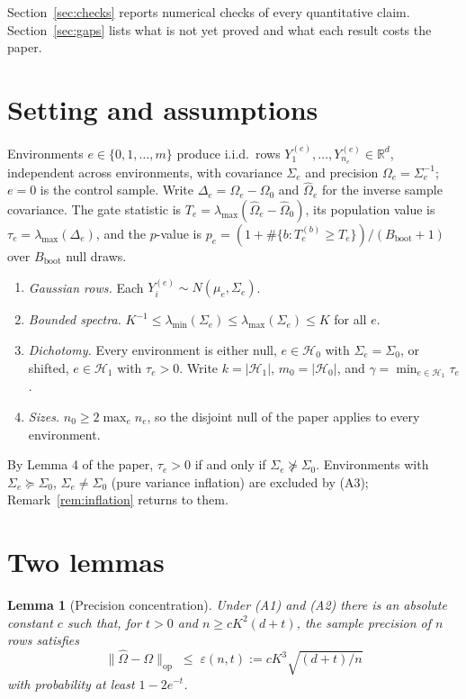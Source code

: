 \documentclass[11pt]{article}
\newtheorem{lemma}{Lemma}
\theoremstyle{remark}
\newcommand{\R}{\mathbb{R}}
\newcommand{\op}{\operatorname}
\newcommand{\Hone}{\mathcal{H}_1}
\newcommand{\Hzero}{\mathcal{H}_0}
\newcommand{\Bb}{B_{\mathrm{boot}}}
\begin{document}
Section~\ref{sec:checks} reports numerical checks of every quantitative claim. Section~\ref{sec:gaps} lists what is not yet proved and what each result costs the paper.

\section{Setting and assumptions}

Environments $e\in\{0,1,\ldots,m\}$ produce i.i.d.\ rows $Y^{(e)}_1,\ldots,Y^{(e)}_{n_e}\in\R^d$, independent across environments, with covariance $\Sigma_e$ and precision $\Omega_e=\Sigma_e^{-1}$; $e=0$ is the control sample. Write $\Delta_e=\Omega_e-\Omega_0$ and $\widehat\Omega_e$ for the inverse sample covariance. The gate statistic is $T_e=\lambda_{\max}(\widehat\Omega_e-\widehat\Omega_0)$, its population value is $\tau_e=\lambda_{\max}(\Delta_e)$, and the $p$-value is $p_e=(1+\#\{b:T_e^{(b)}\ge T_e\})/(\Bb+1)$ over $\Bb$ null draws.

\begin{enumerate}
  \item[(A1)] \emph{Gaussian rows.} Each $Y^{(e)}_i\sim N(\mu_e,\Sigma_e)$.
  \item[(A2)] \emph{Bounded spectra.} $K^{-1}\le\lambda_{\min}(\Sigma_e)\le\lambda_{\max}(\Sigma_e)\le K$ for all $e$.
  \item[(A3)] \emph{Dichotomy.} Every environment is either null, $e\in\Hzero$ with $\Sigma_e=\Sigma_0$, or shifted, $e\in\Hone$ with $\tau_e>0$. Write $k=|\Hone|$, $m_0=|\Hzero|$, and $\gamma=\min_{e\in\Hone}\tau_e$.
  \item[(A4)] \emph{Sizes.} $n_0\ge 2\max_e n_e$, so the disjoint null of the paper applies to every environment.
\end{enumerate}

By Lemma 4 of the paper, $\tau_e>0$ if and only if $\Sigma_e\not\succeq\Sigma_0$. Environments with $\Sigma_e\succeq\Sigma_0$, $\Sigma_e\ne\Sigma_0$ (pure variance inflation) are excluded by (A3); Remark~\ref{rem:inflation} returns to them.

\section{Two lemmas}

\begin{lemma}[Precision concentration]
\label{lem:conc}
Under (A1) and (A2) there is an absolute constant $c$ such that, for $t>0$ and $n\ge c K^2(d+t)$, the sample precision of $n$ rows satisfies
\[
  \|\widehat\Omega-\Omega\|_{\op{op}}\;\le\;\varepsilon(n,t):=cK^3\sqrt{(d+t)/n}
\]
with probability at least $1-2e^{-t}$.
\end{lemma}
\end{document}
